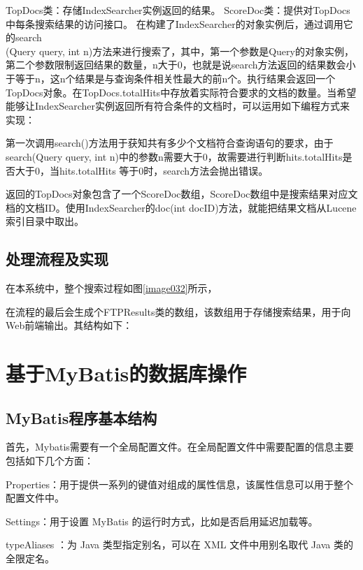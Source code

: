
TopDocs类：存储IndexSearcher实例返回的结果。
ScoreDoc类：提供对TopDocs中每条搜索结果的访问接口。
在构建了IndexSearcher的对象实例后，通过调用它的search\\(Query query, int n)方法来进行搜索了，其中，第一个参数是Query的对象实例，第二个参数限制返回结果的数量，n大于0，也就是说search方法返回的结果数会小于等于n，这n个结果是与查询条件相关性最大的前n个。执行结果会返回一个TopDocs对象。在TopDocs.totalHits中存放着实际符合要求的文档的数量。当希望能够让Index\-Searcher实例返回所有符合条件的文档时，可以运用如下编程方式来实现：



第一次调用search()方法用于获知共有多少个文档符合查询语句的要求，由于search(Query query, int n)中的参数n需要大于0，故需要进行判断hits.totalHits是否大于0，当hits.totalHits 等于0时，search方法会抛出错误。

返回的TopDocs对象包含了一个ScoreDoc数组，ScoreDoc数组中是搜索结果对应文档的文档ID。使用IndexSearcher的doc(int docID)方法，就能把结果文档从Luc\-ene索引目录中取出。

\subsection{处理流程及实现}
\newpage
在本系统中，整个搜索过程如图\ref{image032}所示，


在流程的最后会生成个FTPResults类的数组，该数组用于存储搜索结果，用于向Web前端输出。其结构如下：



\section{基于MyBatis的数据库操作}
\subsection{MyBatis程序基本结构}
首先，Mybatis需要有一个全局配置文件。在全局配置文件中需要配置的信息主要包括如下几个方面：

Properties：用于提供一系列的键值对组成的属性信息，该属性信息可以用于整个配置文件中。

Settings：用于设置 MyBatis 的运行时方式，比如是否启用延迟加载等。

typeAliases ：为 Java 类型指定别名，可以在 XML 文件中用别名取代 Java 类的全限定名。

